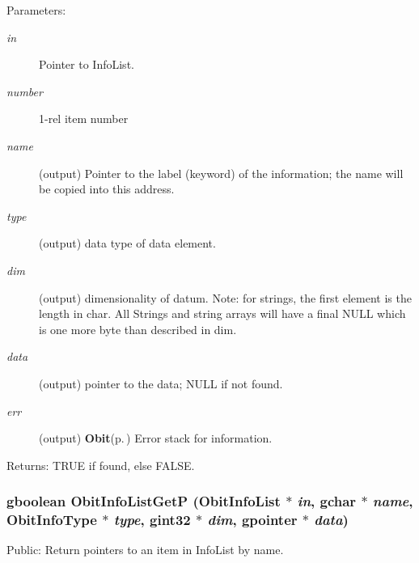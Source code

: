 \begin{Desc}
\item[Parameters:]
\begin{description}
\item[{\em in}]Pointer to Info\-List. \item[{\em number}]1-rel item number \item[{\em name}](output) Pointer to the label (keyword) of the information; the name will be copied into this address. \item[{\em type}](output) data type of data element. \item[{\em dim}](output) dimensionality of datum. Note: for strings, the first element is the length in char. All Strings and string arrays will have a final NULL which is one more byte than described in dim. \item[{\em data}](output) pointer to the data; NULL if not found. \item[{\em err}](output) {\bf Obit}{\rm (p.\,\pageref{structObit})} Error stack for information. \end{description}
\end{Desc}
\begin{Desc}
\item[Returns:]TRUE if found, else FALSE. \end{Desc}
\subsubsection{\setlength{\rightskip}{0pt plus 5cm}gboolean Obit\-Info\-List\-Get\-P ({\bf Obit\-Info\-List} $\ast$ {\em in}, gchar $\ast$ {\em name}, Obit\-Info\-Type $\ast$ {\em type}, gint32 $\ast$ {\em dim}, gpointer $\ast$ {\em data})}\label{ObitInfoList_8c_a17}


Public: Return pointers to an item in Info\-List by name. 

